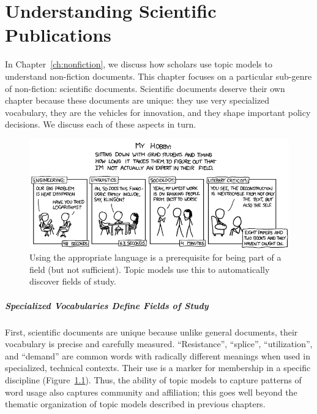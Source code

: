 

\chapter{Understanding Scientific Publications}
\label{ch:sci}

In Chapter~\ref{ch:nonfiction}, we discuss how scholars use topic models to understand
non-fiction documents.  This chapter focuses on a particular sub-genre of
non-fiction: scientific documents.  Scientific documents deserve their own
chapter because these documents are unique: they use very specialized
vocabulary, they are the vehicles for innovation, and they shape important
policy decisions.  We discuss each of these aspects in turn.

\begin{figure}
\includegraphics[width=\linewidth]{figures/sci_faking}
\caption{Using the appropriate language is a prerequisite for being
  part of a field (but not sufficient).  Topic models use this to
  automatically discover fields of study.}
\label{fig:faking}
\end{figure}

\paragraph{Specialized Vocabularies Define Fields of Study}

First, scientific documents are unique because unlike general documents,
their vocabulary is precise and carefully measured.  ``Resistance'', ``splice'',
``utilization'', and ``demand'' are common words with radically different
meanings when used in specialized, technical contexts.  Their use is a
marker for membership in a specific discipline
(Figure~\ref{fig:faking}).  Thus, the ability of topic models to capture
patterns of word usage also captures community and affiliation; this goes well
beyond the thematic organization of topic models described in previous chapters.


